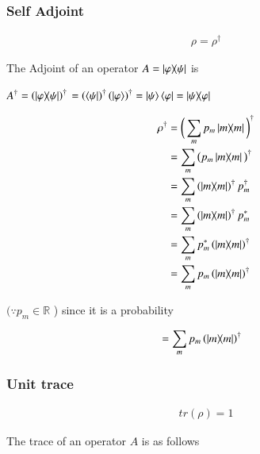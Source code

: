 \subsubsection{Self Adjoint}
\begin{align}
{\rho }={\rho}^{\dagger}
\end{align}

The Adjoint of an operator $ A = \dyad{\varphi}{\psi}$ is \\
\begin{center}
$ A^{\dagger} =\left( \dyad{\varphi}{\psi}\right)^{\dagger}$
$=\left(\bra{\psi}\right)^{\dagger} \left(\ket{\varphi}\right)^{\dagger} = \ket{\psi} \bra{\varphi} = \dyad{\psi}{\varphi}$
\end{center}
\begin{align}\label{aft33:10}
\rho^{\dagger} &= \bigg(\sum_{m}p_{m}\dyad{m}\bigg)^{\dagger}\\
&= \sum_{m}\big(p_{m}\dyad{m}\big)^{\dagger}\\
&= \sum_{m}\left(\dyad{m}\right)^{\dagger}p_{m}^{\dagger}\\
&= \sum_{m}\left(\dyad{m}\right)^{\dagger}p_{m}^{*}\\
&= \sum_{m}p_{m}^{*}\left(\dyad{m}\right)^{\dagger}\\
&= \sum_{m}p_{m}\left(\dyad{m}\right)^{\dagger}
\end{align}

$\big(\because p_{m} \in \mathds{R}$ \big) since it is a probability 

\begin{align}
&=\sum_{m}p_{m}\left(\dyad{m}\right)^{\dagger}
\end{align}




\subsubsection{Unit trace}

\begin{align}
tr({\rho})= 1
\end{align}

The trace of an operator $A$ is as follows 

